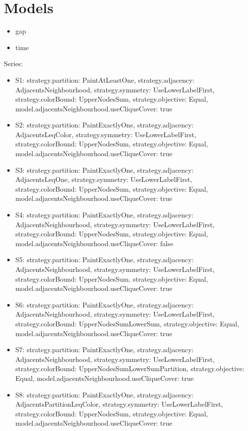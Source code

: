 \documentclass[landscape, 12pt]{report}
\begin{document}
	
	\clearpage

\section{Models}	
	
	\begin{itemize}
	\item gap
	\item time
	\end{itemize}
	Series:
	\begin{itemize}
	\item S1: strategy.partition: PaintAtLeastOne, strategy.adjacency: AdjacentsNeighbourhood, strategy.symmetry: UseLowerLabelFirst, strategy.colorBound: UpperNodesSum, strategy.objective: Equal, model.adjacentsNeighbourhood.useCliqueCover: true
	\item S2: strategy.partition: PaintExactlyOne, strategy.adjacency: AdjacentsLeqColor, strategy.symmetry: UseLowerLabelFirst, strategy.colorBound: UpperNodesSum, strategy.objective: Equal, model.adjacentsNeighbourhood.useCliqueCover: true
	\item S3: strategy.partition: PaintExactlyOne, strategy.adjacency: AdjacentsLeqOne, strategy.symmetry: UseLowerLabelFirst, strategy.colorBound: UpperNodesSum, strategy.objective: Equal, model.adjacentsNeighbourhood.useCliqueCover: true
	\item S4: strategy.partition: PaintExactlyOne, strategy.adjacency: AdjacentsNeighbourhood, strategy.symmetry: UseLowerLabelFirst, strategy.colorBound: UpperNodesSum, strategy.objective: Equal, model.adjacentsNeighbourhood.useCliqueCover: false
	\item S5: strategy.partition: PaintExactlyOne, strategy.adjacency: AdjacentsNeighbourhood, strategy.symmetry: UseLowerLabelFirst, strategy.colorBound: UpperNodesSum, strategy.objective: Equal, model.adjacentsNeighbourhood.useCliqueCover: true
	\item S6: strategy.partition: PaintExactlyOne, strategy.adjacency: AdjacentsNeighbourhood, strategy.symmetry: UseLowerLabelFirst, strategy.colorBound: UpperNodesSumLowerSum, strategy.objective: Equal, model.adjacentsNeighbourhood.useCliqueCover: true
	\item S7: strategy.partition: PaintExactlyOne, strategy.adjacency: AdjacentsNeighbourhood, strategy.symmetry: UseLowerLabelFirst, strategy.colorBound: UpperNodesSumLowerSumPartition, strategy.objective: Equal, model.adjacentsNeighbourhood.useCliqueCover: true
	\item S8: strategy.partition: PaintExactlyOne, strategy.adjacency: AdjacentsPartitionLeqColor, strategy.symmetry: UseLowerLabelFirst, strategy.colorBound: UpperNodesSum, strategy.objective: Equal, model.adjacentsNeighbourhood.useCliqueCover: true
	\end{itemize}
\end{document}
